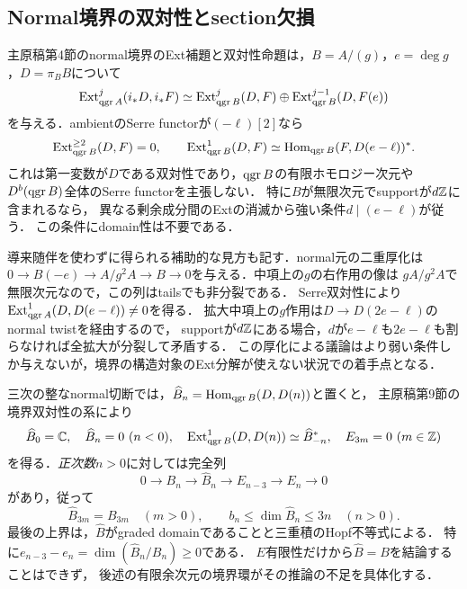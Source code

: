\documentclass[11pt,a4paper]{ltjsarticle}
\begin{document}
\subsection{Normal境界の双対性とsection欠損}
主原稿第4節のnormal境界のExt補題と双対性命題は，$B=A/(g)$，$e=\deg g$，$D=\pi_BB$について
\[
 \operatorname{Ext}^j_{\operatorname{qgr} A}(i_*D,i_*F)
 \simeq\operatorname{Ext}^j_{\operatorname{qgr} B}(D,F)\oplus\operatorname{Ext}^{j-1}_{\operatorname{qgr} B}(D,F(e))
\]
を与える．ambientのSerre functorが$(-\ell)[2]$なら
\[
 \operatorname{Ext}^{\geq2}_{\operatorname{qgr} B}(D,F)=0,\qquad
 \operatorname{Ext}^1_{\operatorname{qgr} B}(D,F)\simeq\operatorname{Hom}_{\operatorname{qgr} B}(F,D(e-\ell))^*.
\]
これは第一変数が$D$である双対性であり，$\operatorname{qgr} B$の有限ホモロジー次元や
$D^b(\operatorname{qgr} B)$全体のSerre functorを主張しない．
特に$B$が無限次元でsupportが$d\mathbb Z$に含まれるなら，
異なる剰余成分間のExtの消滅から強い条件$d\mid(e-\ell)$が従う．
この条件にdomain性は不要である．

導来随伴を使わずに得られる補助的な見方も記す．normal元の二重厚化は
$0\to B(-e)\to A/g^2A\to B\to0$を与える．中項上の$g$の右作用の像は
$gA/g^2A$で無限次元なので，この列はtailsでも非分裂である．
Serre双対性により$\operatorname{Ext}^1_{\operatorname{qgr} A}(D,D(e-\ell))\ne0$を得る．
拡大中項上の$g$作用は$D\to D(2e-\ell)$のnormal twistを経由するので，
supportが$d\mathbb Z$にある場合，$d$が$e-\ell$も$2e-\ell$も割らなければ全拡大が分裂して矛盾する．
この厚化による議論はより弱い条件しか与えないが，境界の構造対象のExt分解が使えない状況での着手点となる．

三次の整なnormal切断では，$\widehat B_n=\operatorname{Hom}_{\operatorname{qgr} B}(D,D(n))$と置くと，
主原稿第9節の境界双対性の系により
\[
 \widehat B_0=\mathbb C,\quad \widehat B_n=0\ (n<0),\quad
 \operatorname{Ext}^1_{\operatorname{qgr} B}(D,D(n))\simeq\widehat B_{-n}^*,\quad
 E_{3m}=0\ (m\in\mathbb Z)
\]
を得る．\emph{正次数}$n>0$に対しては完全列
\[
 0\longrightarrow B_n\longrightarrow\widehat B_n
 \longrightarrow E_{n-3}\longrightarrow E_n\longrightarrow0
\]
があり，従って
\[
 \widehat B_{3m}=B_{3m}\quad(m>0),\qquad
 b_n\leq\dim\widehat B_n\leq3n\quad(n>0).
\]
最後の上界は，$\widehat B$がgraded domainであることと三重積のHopf不等式による．
特に$e_{n-3}-e_n=\dim(\widehat B_n/B_n)\geq0$である．
$E$有限性だけから$\widehat B=B$を結論することはできず，
後述の有限余次元の境界環がその推論の不足を具体化する．
\end{document}
